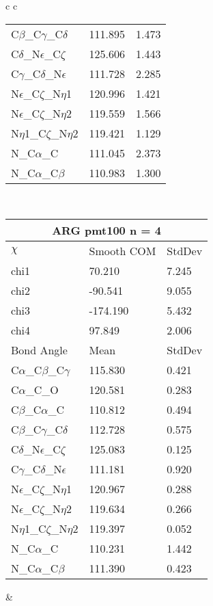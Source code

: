 \begin{longtable}{ c c }
\begin{tabular}{ l l l }
  C$\beta$\_C$\gamma$\_C$\delta$ & 111.895 & 1.473\\
  C$\delta$\_N$\epsilon$\_C$\zeta$ & 125.606 & 1.443\\
  C$\gamma$\_C$\delta$\_N$\epsilon$ & 111.728 & 2.285\\
  N$\epsilon$\_C$\zeta$\_N$\eta$1 & 120.996 & 1.421\\
  N$\epsilon$\_C$\zeta$\_N$\eta$2 & 119.559 & 1.566\\
  N$\eta$1\_C$\zeta$\_N$\eta$2 & 119.421 & 1.129\\
  N\_C$\alpha$\_C & 111.045 & 2.373\\
  N\_C$\alpha$\_C$\beta$ & 110.983 & 1.300\\
  \bottomrule
  \end{tabular}
  \\
  \begin{tabular}{ l l l }
  \toprule
  \multicolumn{3}{c}{ARG \textbf{pmt100} n = 4} \\ \toprule
  $\chi$       & Smooth COM & StdDev \\ \midrule
  chi1 & 70.210 & 7.245 \\ 
  chi2 & -90.541 & 9.055 \\ 
  chi3 & -174.190 & 5.432 \\ 
  chi4 & 97.849 & 2.006 \\ \midrule
  Bond Angle   & Mean     & StdDev \\ \midrule
  C$\alpha$\_C$\beta$\_C$\gamma$ & 115.830 & 0.421\\
  C$\alpha$\_C\_O & 120.581 & 0.283\\
  C$\beta$\_C$\alpha$\_C & 110.812 & 0.494\\
  C$\beta$\_C$\gamma$\_C$\delta$ & 112.728 & 0.575\\
  C$\delta$\_N$\epsilon$\_C$\zeta$ & 125.083 & 0.125\\
  C$\gamma$\_C$\delta$\_N$\epsilon$ & 111.181 & 0.920\\
  N$\epsilon$\_C$\zeta$\_N$\eta$1 & 120.967 & 0.288\\
  N$\epsilon$\_C$\zeta$\_N$\eta$2 & 119.634 & 0.266\\
  N$\eta$1\_C$\zeta$\_N$\eta$2 & 119.397 & 0.052\\
  N\_C$\alpha$\_C & 110.231 & 1.442\\
  N\_C$\alpha$\_C$\beta$ & 111.390 & 0.423\\
  \bottomrule
  \end{tabular}
  &
  \begin{tabular}{ l l l }

\end{tabular}
\end{longtable}
